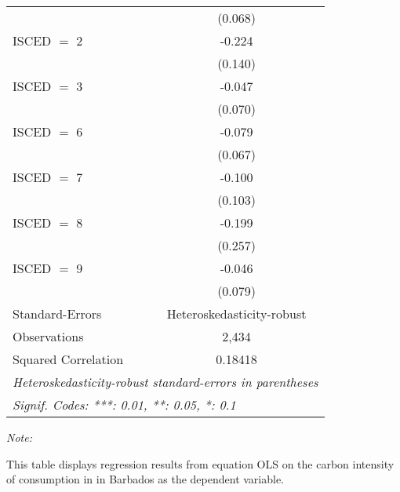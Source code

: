 \begin{table}[htbp!]
\begin{adjustbox}{width = 1\textwidth, max height = 0.95\textheight, center}
\begin{threeparttable}[b]
\begin{tabular}{lc}
                                & (0.068)\\   
            ISCED $=$ 2         & -0.224\\   
                                & (0.140)\\   
            ISCED $=$ 3         & -0.047\\   
                                & (0.070)\\   
            ISCED $=$ 6         & -0.079\\   
                                & (0.067)\\   
            ISCED $=$ 7         & -0.100\\   
                                & (0.103)\\   
            ISCED $=$ 8         & -0.199\\   
                                & (0.257)\\   
            ISCED $=$ 9         & -0.046\\   
                                & (0.079)\\   
            \midrule 
            Standard-Errors     & Heteroskedasticity-robust \\   
            Observations        & 2,434\\  
            Squared Correlation & 0.18418\\  
            \midrule \midrule
            \multicolumn{2}{l}{\emph{Heteroskedasticity-robust standard-errors in parentheses}}\\
            \multicolumn{2}{l}{\emph{Signif. Codes: ***: 0.01, **: 0.05, *: 0.1}}\\
         \end{tabular}
         
         \begin{tablenotes}\item \medskip \textit{Note:}
            \item This table displays regression results from equation OLS on the carbon intensity of consumption in  in Barbados as the dependent variable. 
         \end{tablenotes}
      \end{threeparttable}
   \end{adjustbox}
\end{table}


